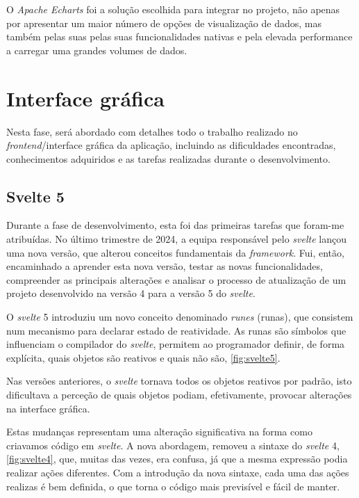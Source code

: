 O \textit{Apache Echarts} foi a solução escolhida para integrar no projeto, não apenas por apresentar um maior número de opções de visualização de dados, mas também pelas suas pelas suas funcionalidades nativas e pela elevada performance a carregar uma grandes volumes de dados. 

\clearpage
\section{Interface gráfica}\label{sec:frontend}
Nesta fase, será abordado com detalhes todo o trabalho realizado no \textit{frontend}/interface gráfica da aplicação, incluindo as dificuldades encontradas, conhecimentos adquiridos e as tarefas realizadas durante o desenvolvimento.  

\subsection{Svelte 5}\label{sec:svelte5} %
Durante a fase de desenvolvimento, esta foi das primeiras tarefas que foram-me atribuídas. No último trimestre de 2024, a equipa responsável pelo \textit{svelte} lançou uma nova versão, que alterou conceitos fundamentais da \textit{framework}. Fui, então, encaminhado a aprender esta nova versão, testar as novas funcionalidades, compreender as principais alterações e analisar o processo de atualização de um projeto desenvolvido na versão 4 para a versão 5 do \textit{svelte}.  

O \textit{svelte} 5 introduziu um novo conceito denominado \textit{runes} (runas), que consistem num mecanismo para declarar estado de reatividade. As runas são símbolos que influenciam o compilador do \textit{svelte}, permitem ao programador definir, de forma explícita, quais objetos são reativos e quais não são, \autoref{fig:svelte5}. 

Nas versões anteriores, o \textit{svelte} tornava todos os objetos reativos por padrão, isto dificultava a perceção de quais objetos podiam, efetivamente, provocar alterações na interface gráfica.

Estas mudanças representam uma alteração significativa na forma como criavamos código em \textit{svelte}. A nova abordagem, removeu a sintaxe do \textit{svelte} 4, \autoref{fig:svelte4}, que, muitas das vezes, era confusa, já que a mesma expressão podia realizar ações diferentes. Com a introdução da nova sintaxe, cada uma das ações realizas é bem definida, o que torna o código mais previsível e fácil de manter. 

